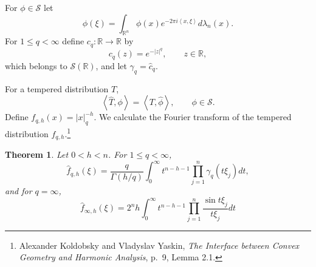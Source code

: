 \documentclass{article}
\newcommand{\inner}[2]{\left\langle #1, #2 \right\rangle}
\newtheorem{theorem}{Theorem}
\theoremstyle{definition}
\begin{document}
For $\phi \in \mathscr{S}$ let
\[
\widehat{\phi}(\xi) = \int_{\mathbb{R}^n} \phi(x) e^{-2\pi i\inner{x}{\xi}} d\lambda_n(x).
\]
For $1 \leq q < \infty$ define $c_q:\mathbb{R} \to \mathbb{R}$ by
\[
c_q(z) = e^{-|z|^q},\qquad z \in \mathbb{R}, 
\]
which belongs to $\mathscr{S}(\mathbb{R})$,
and let $\gamma_q = \widehat{c}_q$. 

For a tempered distribution $T$, 
\[
\inner{\widehat{T}}{\phi} = \inner{T}{\widehat{\phi}},\qquad \phi \in \mathscr{S}.
\]
Define $f_{q,h}(x)=|x|_q^{-h}$. 
We calculate the Fourier transform of the tempered distribution $f_{q,h}$.\footnote{Alexander Koldobsky and
Vladyslav Yaskin, {\em The Interface between Convex Geometry and Harmonic Analysis},
p.~9, Lemma 2.1.}

\begin{theorem}
Let $0<h<n$. 
For $1 \leq q < \infty$,
\[
\widehat{f}_{q,h}(\xi) = \frac{q}{\Gamma(h/q)} \int_0^\infty t^{n-h-1} \prod_{j=1}^n \gamma_q(t\xi_j) dt,
\]
and for $q=\infty$,
\[
\widehat{f}_{\infty,h}(\xi) = 2^n h \int_0^\infty t^{n-h-1} \prod_{j=1}^n \frac{\sin t\xi_j}{t\xi_j} dt
\]
\end{theorem}
\end{document}
